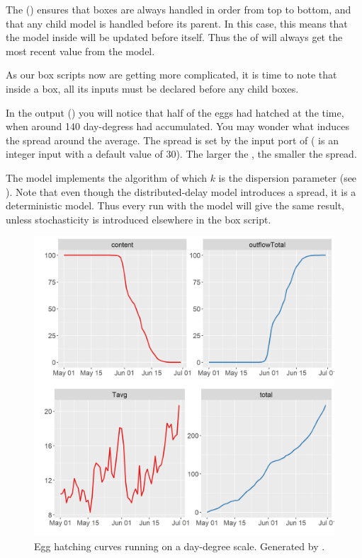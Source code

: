 The  () ensures that boxes are always handled in order from top to bottom, and that any child model is handled before its parent. In this case, this means that the  model inside  will be updated before  itself. Thus the  of  will always get the most recent value from the  model.

As our box scripts now are getting more complicated, it is time to note that inside a box, all its inputs must be declared before any child boxes. 

In the output () you will notice that half of the eggs had hatched at the time, when around 140 day-degress had accumulated. You may wonder what induces the spread around the average. The spread is set by the  input port of  ( is an integer input with a default value of 30). The larger the , the smaller the spread. 

The  model implements the  algorithm of which \(k\) is the dispersion parameter (see ). Note that even though the distributed-delay model introduces a spread, it is a deterministic model. Thus every run with the  model will give the same result, unless stochasticity is introduced elsewhere in the box script.


\begin{figure} [t]
\centering
\includegraphics[scale=0.5]{graphics/egg5}
\caption{Egg hatching curves running on a day-degree scale. Generated by .}
\label{fig:egg5}
\end{figure}



